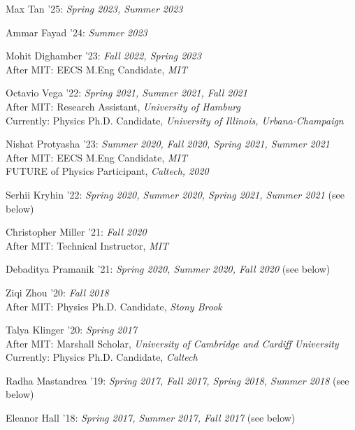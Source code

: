 \bbl

\item Max Tan '25: \emph{Spring 2023, Summer 2023}

\item Ammar Fayad '24: \emph{Summer 2023}

\item Mohit Dighamber '23: \emph{Fall 2022, Spring 2023}
\\ After MIT: EECS M.Eng Candidate, \emph{MIT}

\item Octavio Vega '22: \emph{Spring 2021, Summer 2021, Fall 2021}
\\ After MIT: Research Assistant, \emph{University of Hamburg}
\\ Currently: Physics Ph.D. Candidate, \emph{University of Illinois, Urbana-Champaign}

\item Nishat Protyasha '23: \emph{Summer 2020, Fall 2020, Spring 2021, Summer 2021}
\\ After MIT: EECS M.Eng Candidate, \emph{MIT}
\\ FUTURE of Physics Participant, \emph{Caltech, 2020}

\item Serhii Kryhin '22: \emph{Spring 2020, Summer 2020, Spring 2021, Summer 2021} (see below) 

\item Christopher Miller '21: \emph{Fall 2020}
\\ After MIT: Technical Instructor, \emph{MIT}

\item Debaditya Pramanik '21: \emph{Spring 2020, Summer 2020, Fall 2020} (see below) 

\item Ziqi Zhou '20: \emph{Fall 2018}
\\ After MIT: Physics Ph.D. Candidate, \emph{Stony Brook}

\item Talya Klinger '20: \emph{Spring 2017}
\\ After MIT: Marshall Scholar, \emph{University of Cambridge and Cardiff University}
\\ Currently: Physics Ph.D. Candidate, \emph{Caltech}

\item Radha Mastandrea '19: \emph{Spring 2017, Fall 2017, Spring 2018, Summer 2018} (see below) 

\item Eleanor Hall '18: \emph{Spring 2017, Summer 2017, Fall 2017} (see below) 

